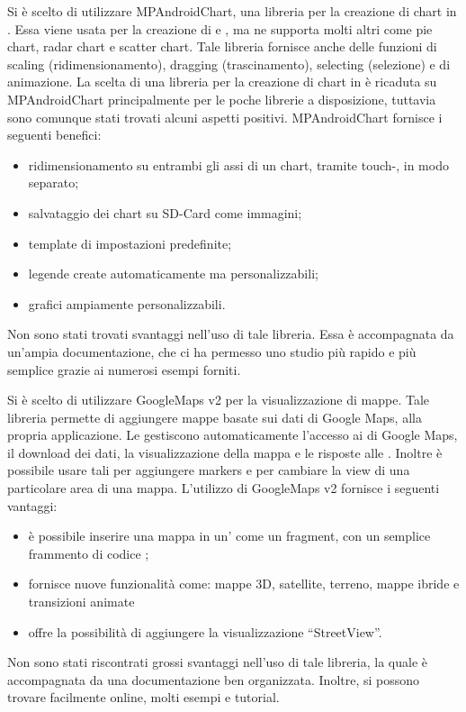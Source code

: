 Si è scelto di utilizzare MPAndroidChart, una libreria per la creazione di chart in . Essa viene usata per la creazione di  e , ma ne supporta molti altri come pie chart, radar chart e scatter chart. Tale libreria fornisce anche delle funzioni di scaling (ridimensionamento), dragging (trascinamento), selecting (selezione) e di animazione. La scelta di una libreria per la creazione di chart in  è ricaduta su MPAndroidChart principalmente per le poche librerie a disposizione, tuttavia sono comunque stati trovati alcuni aspetti positivi.
MPAndroidChart fornisce i seguenti benefici:
\begin{itemize}
\item ridimensionamento su entrambi gli assi di un chart, tramite touch-, in modo separato;
\item salvataggio dei chart su SD-Card come immagini;
\item template di impostazioni predefinite;
\item legende create automaticamente ma personalizzabili;
\item grafici ampiamente personalizzabili.
\end{itemize}
Non sono stati trovati svantaggi nell'uso di tale libreria. Essa è accompagnata da un'ampia documentazione, che ci ha permesso uno studio più rapido e più semplice grazie ai numerosi esempi forniti.

Si è scelto di utilizzare GoogleMaps   v2 per la visualizzazione di mappe. Tale libreria permette di aggiungere mappe basate sui dati di Google Maps, alla propria applicazione. Le  gestiscono automaticamente l'accesso ai  di Google Maps, il download dei dati, la visualizzazione della mappa e le risposte alle . Inoltre è possibile usare tali  per aggiungere markers e per cambiare la view di una particolare area di una mappa.
L'utilizzo di GoogleMaps   v2 fornisce i seguenti vantaggi:
\begin{itemize}
\item è possibile inserire una mappa in un' come un fragment, con un semplice frammento di codice ;
\item fornisce nuove funzionalità come: mappe 3D, satellite, terreno, mappe ibride e transizioni animate
\item offre la possibilità di aggiungere la visualizzazione “StreetView”.
\end{itemize}
Non sono stati riscontrati grossi svantaggi nell'uso di tale libreria, la quale è accompagnata da una documentazione ben organizzata. Inoltre, si possono trovare facilmente online, molti esempi e tutorial.

